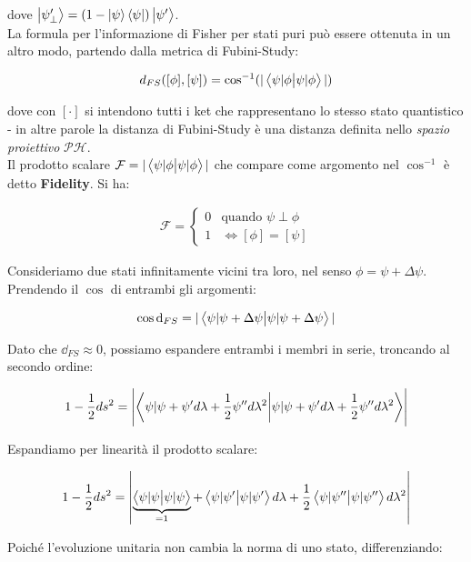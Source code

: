 \documentclass[main_zanardi.tex]{subfiles}
\begin{document}
dove $\ket{\psi_\perp'}=(1-\ket{\psi}\bra{\psi})\ket{\psi'}$.\\

La formula per l'informazione di Fisher per stati puri può essere ottenuta in un altro modo, partendo dalla metrica di Fubini-Study:

\begin{align*}
d_{FS} ([\phi], [\psi]) = \cos^{-1}(|\braket{\psi|\phi}|)
\end{align*}

dove con $[\cdot]$ si intendono tutti i ket che rappresentano lo stesso stato quantistico - in altre parole la distanza di Fubini-Study è una distanza definita nello \textit{spazio proiettivo} $\mathcal{P}\mathcal{H}$.\\
Il prodotto scalare $\mathcal{F}=|\braket{\psi|\phi}|$ che compare come argomento nel $\cos^{-1}$ è detto \textbf{Fidelity}. Si ha:

\begin{align*}
\mathcal{F} = \begin{cases}
0 & \text{quando } \psi \perp \phi\\
1 & \Leftrightarrow [\phi]=[\psi]
\end{cases}
\end{align*}

Consideriamo due stati infinitamente vicini tra loro, nel senso $\phi = \psi + \Delta\psi$. Prendendo il $\cos$ di entrambi gli argomenti:

\begin{align*}
\cos \dd_{FS} = |\braket{\psi|\psi+\Delta\psi}|
\end{align*}

Dato che $\dd_{FS}\approx 0$, possiamo espandere entrambi i membri in serie, troncando al secondo ordine:

\begin{align*}
1-\frac{1}{2} ds^2 = \left|\braket{\psi|\psi + \psi'd\lambda + \frac{1}{2}\psi'' d\lambda^2}\right|
\end{align*}

Espandiamo per linearità il prodotto scalare:

\begin{align}
1-\frac{1}{2}ds^2 = \left| \underbrace{\braket{\psi|\psi} }_{=1}+ \braket{\psi|\psi'}d\lambda + \frac{1}{2} \braket{\psi|\psi''}d\lambda^2 \right|
\label{eqn:espansione-metrica}
 \end{align}

Poiché l'evoluzione unitaria non cambia la norma di uno stato, differenziando:
\end{document}
